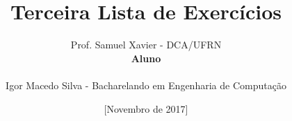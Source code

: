 
\title{Terceira Lista de Exercícios}

\author{
Prof. Samuel Xavier - DCA/UFRN\\

\textbf{Aluno}\\
\\
Igor Macedo Silva - Bacharelando em Engenharia de Computação \\
}

\date{[Novembro de 2017]}

\makeatletter
\def\@maketitle{
\begin{center}
   \texttt{[image: cover/imgs/ufrn.png]}\\
   \vfill
   {\large Universidade Federal do Rio Grande do Norte\\
   Departamento de Engenharia de Computacão e Automação}

   \vskip 4em
   {\Large Programação Concorrente e Distribuida}

   \vskip 4.5em
   {\normalsize\printwp}

   \vskip 5em
   {\LARGE\bfseries\@title}

   \vfill
   {\normalsize Natal-RN, Brasil\\\@date}
\end{center}

\newpage
{\noindent\Large\bfseries Professor}\smallskip\\
{\normalsize\@author}
}
\makeatother




\frenchspacing
\maketitle
\thispagestyle{empty}

\newpage
\tableofcontents
\thispagestyle{empty}

\newpage
\listoffigures
\thispagestyle{empty}

\newpage
\listoftables
\thispagestyle{empty}

